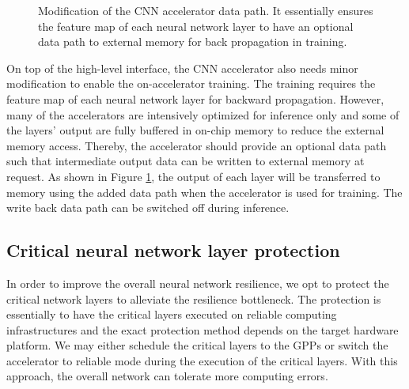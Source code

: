 
\begin{figure}
        \caption{Modification of the CNN accelerator data path. It essentially
ensures the feature map of each neural network layer to have an optional data path
to external memory for back propagation in training.}
        \label{fig:change_of_accelerator}
        \vspace{-1em}
\end{figure}

On top of the high-level interface, the CNN accelerator also needs 
minor modification to enable the on-accelerator training. 
The training requires the feature map of each neural 
network layer for backward propagation. However, many of the accelerators 
are intensively optimized for inference only and some of the layers' output 
are fully buffered in on-chip memory to reduce the external memory access. 
Thereby, the accelerator should provide an optional data path such that 
intermediate output data can be written to external memory at request.
As shown in Figure \ref{fig:change_of_accelerator}, the output of each layer 
will be transferred to memory using the added data path 
when the accelerator is used for training. The write back data path 
can be switched off during inference. 

\subsection{Critical neural network layer protection}
In order to improve the overall neural network resilience, we opt to 
protect the critical network layers to alleviate the resilience 
bottleneck. The protection is essentially 
to have the critical layers executed on reliable computing infrastructures 
and the exact protection method depends on the target hardware platform.
We may either schedule the critical layers to the GPPs or switch the accelerator 
to reliable mode during the execution of the critical layers.
With this approach, the overall network can tolerate 
more computing errors. 

